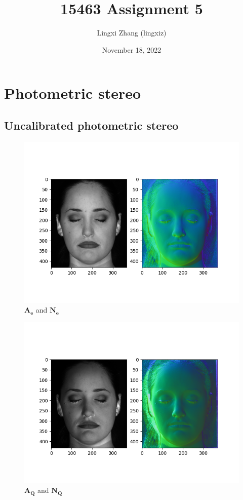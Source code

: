 \documentclass{article}
\title{15463 Assignment 5}
\author{Lingxi Zhang (lingxiz)}
\date{November 18, 2022}
\begin{document}
\maketitle

\section{Photometric stereo}
\subsection{Uncalibrated photometric stereo}
\begin{figure}[ht]
    \centering
    \includegraphics[scale=0.8]{../data/output/default.png}
    \caption{$\mathbf{A_e}$ and $\mathbf{N_e}$}
\end{figure}
\begin{figure}[ht]
    \centering
    \includegraphics[scale=0.8]{../data/output/Q.png}
    \caption{$\mathbf{A_Q}$ and $\mathbf{N_Q}$}
\end{figure}
\end{document}
